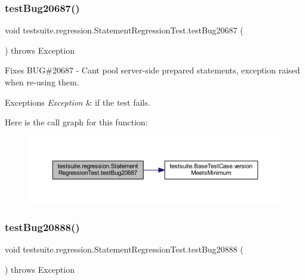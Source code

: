 \subsubsection{\texorpdfstring{test\+Bug20687()}{testBug20687()}}
{\footnotesize\ttfamily void testsuite.\+regression.\+Statement\+Regression\+Test.\+test\+Bug20687 (\begin{DoxyParamCaption}{ }\end{DoxyParamCaption}) throws Exception}

Fixes B\+UG\#20687 -\/ Can\textquotesingle{}t pool server-\/side prepared statements, exception raised when re-\/using them.


\begin{DoxyExceptions}{Exceptions}
{\em Exception} & if the test fails. \\
\hline
\end{DoxyExceptions}
Here is the call graph for this function\+:
\nopagebreak
\begin{figure}[H]
\begin{center}
\leavevmode
\includegraphics[width=350pt]{classtestsuite_1_1regression_1_1_statement_regression_test_a0267fce90c408fe4f218251a41707fdc_cgraph}
\end{center}
\end{figure}
\mbox{\label{classtestsuite_1_1regression_1_1_statement_regression_test_a1c0e3e171ebbd64605711647d9b930c0}} 
\subsubsection{\texorpdfstring{test\+Bug20888()}{testBug20888()}}
{\footnotesize\ttfamily void testsuite.\+regression.\+Statement\+Regression\+Test.\+test\+Bug20888 (\begin{DoxyParamCaption}{ }\end{DoxyParamCaption}) throws Exception}

